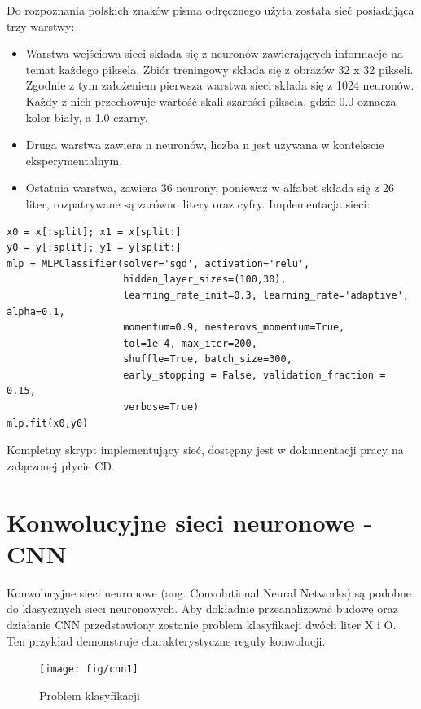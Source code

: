 \documentclass[brudnopis]{xmgr}
\begin{document}
Do rozpoznania polskich znaków pisma odręcznego użyta została sieć posiadająca trzy warstwy:

\begin{itemize}
\item
Warstwa wejściowa sieci składa się z neuronów zawierających informacje na temat każdego piksela. Zbiór treningowy składa się z obrazów 32 x 32 pikseli. Zgodnie z tym założeniem pierwsza warstwa sieci składa się z 1024 neuronów. Każdy z nich przechowuje wartość skali szarości piksela, gdzie 0.0 oznacza kolor biały, a 1.0 czarny.
\item
Druga warstwa zawiera n neuronów, liczba n jest używana w kontekscie eksperymentalnym.
\item
Ostatnia warstwa, zawiera 36 neurony, ponieważ w alfabet składa się z 26 liter, rozpatrywane są zarówno litery oraz cyfry. Implementacja sieci:
\end{itemize}

\begin{verbatim}
x0 = x[:split]; x1 = x[split:]
y0 = y[:split]; y1 = y[split:]
mlp = MLPClassifier(solver='sgd', activation='relu',
                    hidden_layer_sizes=(100,30),
                    learning_rate_init=0.3, learning_rate='adaptive', alpha=0.1,
                    momentum=0.9, nesterovs_momentum=True,
                    tol=1e-4, max_iter=200,
                    shuffle=True, batch_size=300,
                    early_stopping = False, validation_fraction = 0.15,
                    verbose=True)
mlp.fit(x0,y0)
\end{verbatim}

Kompletny skrypt implementujący sieć, dostępny jest w dokumentacji pracy na załączonej płycie CD.
\newpage

\section{Konwolucyjne sieci neuronowe - CNN}

Konwolucyjne sieci neuronowe (ang. Convolutional Neural Networks) są podobne do klasycznych sieci neuronowych. Aby dokładnie przeanalizować budowę oraz działanie CNN przedstawiony zostanie problem klasyfikacji dwóch liter X i O. Ten przykład demonstruje charakterystyczne reguły konwolucji.

\begin{figure}[!tbh]
\centering
\texttt{[image: fig/cnn1]}
\caption{Problem klasyfikacji}
\end{figure}
\end{document}
